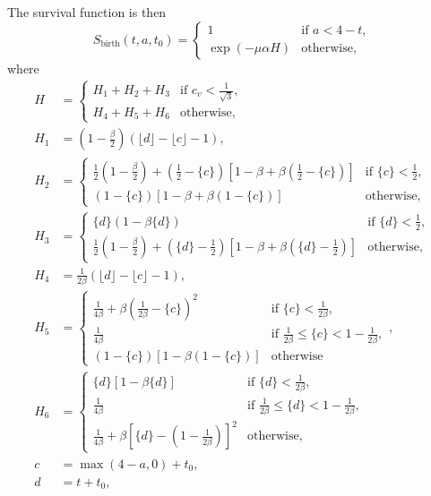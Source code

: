 \documentclass{jpmarticle}
\begin{document}
The survival function is then
\begin{equation}
  S_{\text{birth}}(t, a, t_0) =
  \begin{cases}
    1 & \text{if $a < 4 - t$},
    \\
    \exp(-\mu \alpha H) & \text{otherwise},
  \end{cases}
\end{equation}
where
\begin{align}
  H &=
  \begin{cases}
    H_1 + H_2  + H_3
    & \text{if $c_v < \frac{1}{\sqrt{3}}$},
    \\
    H_4 + H_5 + H_6
    & \text{otherwise},
  \end{cases}
  \\
  H_1 &= \left(1 - \frac{\beta}{2}\right)
  \left(\lfloor d \rfloor - \lfloor c \rfloor - 1\right),
  \\
  H_2 &=
  \begin{cases}
    \frac{1}{2} \left(1 - \frac{\beta}{2}\right)
    + \left(\frac{1}{2} - \{c\}\right)
    \left[1 - \beta
      + \beta \left(\frac{1}{2} - \{c\}\right)\right]
    & \text{if $\{c\} < \frac{1}{2}$},
    \\
    \left(1 - \{c\}\right)
    \left[1 - \beta + \beta \left(1 - \{c\}\right)\right]
    & \text{otherwise},
  \end{cases}
  \\
  H_3 &=
  \begin{cases}
    \{d\}\left(1 - \beta \{d\}\right)
    & \text{if $\{d\} < \frac{1}{2}$},
    \\
    \frac{1}{2} \left(1 - \frac{\beta}{2}\right)
    + \left(\{d\} - \frac{1}{2}\right)
    \left[1 - \beta
      + \beta \left(\{d\} - \frac{1}{2}\right)\right]
    & \text{otherwise},
    \end{cases}
  \\
  H_4 &= \frac{1}{2 \beta}
  \left(\lfloor d \rfloor - \lfloor c \rfloor - 1\right),
  \\
  H_5 &=
  \begin{cases}
    \frac{1}{4 \beta}
    + \beta \left(\frac{1}{2 \beta} - \{c\}\right)^2
    & \text{if $\{c\} < \frac{1}{2 \beta}$},
    \\
    \frac{1}{4 \beta}
    & \text{if $\frac{1}{2 \beta} \leq \{c\} < 1 - \frac{1}{2 \beta}$},
    \\
    \left(1 - \{c\}\right) \left[1 -
      \beta \left(1 - \{c\}\right)\right]
    & \text{otherwise}
  \end{cases},
  \\
  H_6 &=
  \begin{cases}
    \{d\} \left[1 - \beta \{d\}\right]
    & \text{if $\{d\} < \frac{1}{2 \beta}$},
    \\
    \frac{1}{4 \beta}
    & \text{if $\frac{1}{2 \beta} \leq \{d\} <
      1 - \frac{1}{2 \beta}$},
    \\
    \frac{1}{4 \beta}
    + \beta
    \left[\{d\} - \left(1 - \frac{1}{2 \beta}\right)\right]^2
    & \text{otherwise},
  \end{cases}
  \\
  c &= \max(4 - a, 0) + t_0,
  \\
  d &= t + t_0,
\end{align}
\end{document}
